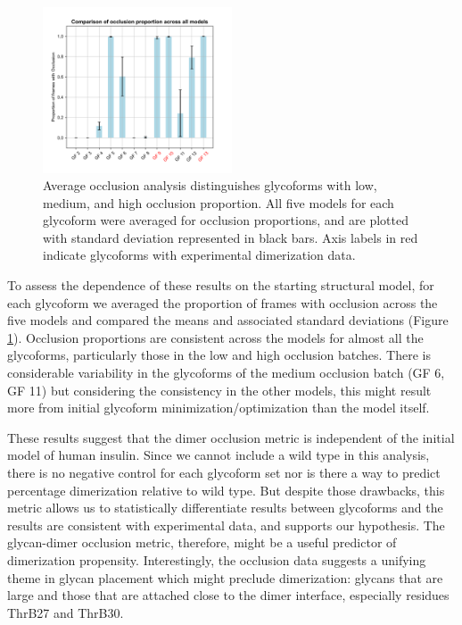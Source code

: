 \documentclass[sn-vancouver]{sn-jnl}
\begin{document}
\begin{figure}[H]
\centering
\includegraphics[width=0.50\textwidth]{Figures/occlusion_proportion_averaged.png}
\caption{Average occlusion analysis distinguishes glycoforms with low, medium, and high occlusion proportion. All five models for each glycoform were averaged for occlusion proportions, and are plotted with standard deviation represented in black bars. Axis labels in red indicate glycoforms with experimental dimerization data.}
\label{occlusion_results}
\end{figure}

To assess the dependence of these results on the starting structural model, for each glycoform we averaged the proportion of frames with occlusion across the five models and compared the means and associated standard deviations (Figure \ref{occlusion_results}). Occlusion proportions are consistent across the models for almost all the glycoforms, particularly those in the low and high occlusion batches. There is considerable variability in the glycoforms of the medium occlusion batch (GF 6, GF 11) but considering the consistency in the other models, this might result more from initial glycoform minimization/optimization than the model itself.

These results suggest that the dimer occlusion metric is independent of the initial model of human insulin. Since we cannot include a wild type in this analysis, there is no negative control for each glycoform set nor is there a way to predict percentage dimerization relative to wild type. But despite those drawbacks, this metric allows us to statistically differentiate results between glycoforms and the results are consistent with experimental data, and supports our hypothesis. The glycan-dimer occlusion metric, therefore, might be a useful predictor of dimerization propensity. Interestingly, the occlusion data suggests a unifying theme in glycan placement which might preclude dimerization: glycans that are large and those that are attached close to the dimer interface, especially residues ThrB27 and ThrB30.
\end{document}
